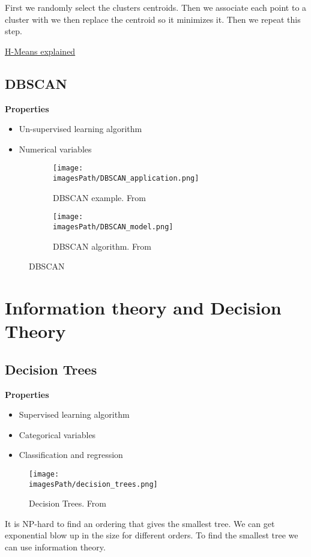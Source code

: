 First we randomly select the clusters centroids. Then we associate each 
point to a cluster with we then replace the centroid so it minimizes it.
Then we repeat this step.  

\href{https://www.youtube.com/watch?v=4b5d3muPQmA}{H-Means explained}

\subsection{DBSCAN}
\textbf{Properties}
\begin{itemize}
    \item Un-supervised learning algorithm
    \item Numerical variables 
\end{itemize}


\begin{figure}[!h]
     \centering
     \begin{subfigure}[b]{0.4\textwidth}
         \centering
         \texttt{[image: \\imagesPath/DBSCAN\_application.png]}
         \caption{DBSCAN example. From \cite{}}
     \end{subfigure}
     \hfill
     \begin{subfigure}[b]{0.4\textwidth}
         \centering
         \texttt{[image: \\imagesPath/DBSCAN\_model.png]}
         \caption{DBSCAN algorithm. From \cite{}}
     \end{subfigure}
    \caption{DBSCAN}
    \label{fig:DBSCAN}
\end{figure}



\section{Information theory and Decision Theory}
\subsection{Decision Trees}
\textbf{Properties}
\begin{itemize}
    \item Supervised learning algorithm
    \item Categorical variables 
    \item Classification and regression
\end{itemize}

\begin{figure}[!h]
    \centering
    \texttt{[image: \\imagesPath/decision\_trees.png]}
    \caption{Decision Trees. From \cite{}}
\end{figure}
It is NP-hard to find an ordering that gives the smallest tree.
We can get exponential blow up in the size for different orders.
To find the smallest tree we can use information theory.

